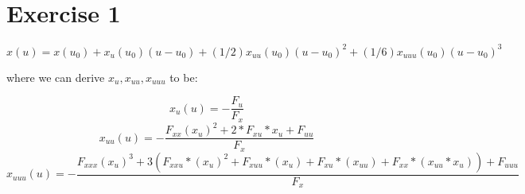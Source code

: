 \documentclass[a4paper]{article}
\begin{document}
\section*{Exercise 1}

$$x(u) = x(u_0) + x_u(u_0)(u - u_0) + (1/2)x_{uu}(u_0)(u - u_0)^2 + (1/6) x_{uuu}(u_0)(u-u_0)^3$$

where we can derive $x_u, x_{uu}, x_{uuu}$ to be:

$$x_u (u) = -\frac{F_u}{F_x}$$
$$x_{uu} (u) = -\frac{F_{xx}(x_u)^2 +2*F_{xu}*x_u +F_{uu}}{F_x}$$
$$x_{uuu} (u) = -\frac{F_{xxx}(x_u)^3+3(F_{xxu}*(x_u)^2 + F_{xuu}*(x_u) + F_{xu}*(x_{uu}) + F_{xx}*(x_{uu}*x_u)) +F_{uuu} }{F_x}$$
\end{document}
